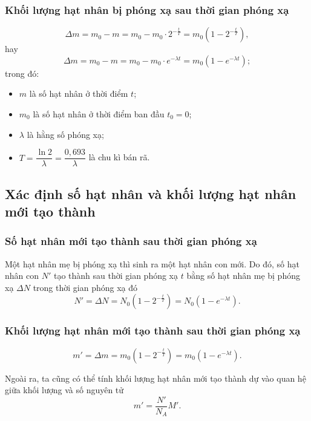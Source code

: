 \subsubsection{Khối lượng hạt nhân bị phóng xạ sau thời gian phóng xạ}
\begin{equation}
	\Delta m = m_0 - m = m_0 - m_0\cdot 2^{-\frac{t}{T}} = m_0\left( 1-2^{-\frac{t}{T}}\right),
\end{equation}
hay
\begin{equation}
	\Delta m = m_0 - m = m_0 - m_0\cdot e^{-\lambda t} = m_0\left( 1-e^{-\lambda t}\right);
\end{equation}
trong đó:
\begin{itemize}
	\item $m$ là số hạt nhân ở thời điểm $t$;
	\item $m_0$ là số hạt nhân ở thời điểm ban đầu $t_0=0$;
	\item $\lambda$ là hằng số phóng xạ;
	\item $T=\dfrac{\ln2}{\lambda}=\dfrac{0,693}{\lambda}$ là chu kì bán rã.
\end{itemize}


\subsection{Xác định số hạt nhân và khối lượng hạt nhân mới tạo thành}

\subsubsection{Số hạt nhân mới tạo thành sau thời gian phóng xạ}	
Một hạt nhân mẹ bị phóng xạ thì sinh ra một hạt nhân con mới. Do đó, số hạt nhân con $N'$ tạo thành sau thời gian phóng xạ $t$ bằng số hạt nhân mẹ bị phóng xạ $\Delta N$ trong thời gian phóng xạ đó	
\begin{equation}
	N'=\Delta N = N_0\left( 1-2^{-\frac{t}{T}}\right)=N_0\left( 1-e^{-\lambda t}\right).
\end{equation}
\subsubsection{Khối lượng hạt nhân mới tạo thành sau thời gian phóng xạ}
\begin{equation}
	m'=\Delta m = m_0\left( 1-2^{-\frac{t}{T}}\right)=m_0\left( 1-e^{-\lambda t}\right).
\end{equation}

Ngoài ra, ta cũng có thể tính khối lượng hạt nhân mới tạo thành dự vào quan hệ giữa khối lượng và số nguyên tử
\begin{equation}
	m'=\dfrac{N'}{N_A}M'.
\end{equation}

